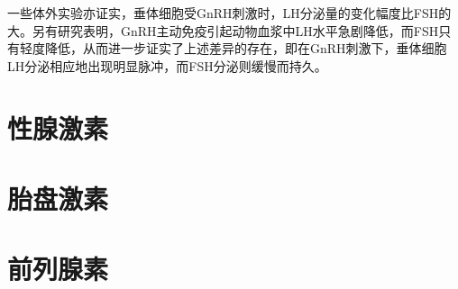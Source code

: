 一些体外实验亦证实，垂体细胞受GnRH刺激时，LH分泌量的变化幅度比FSH的大。另有研究表明，GnRH主动免疫引起动物血浆中LH水平急剧降低，而FSH只有轻度降低，从而进一步证实了上述差异的存在，即在GnRH刺激下，垂体细胞LH分泌相应地出现明显脉冲，而FSH分泌则缓慢而持久。




\section{性腺激素}

\section{胎盘激素}

\section{前列腺素}